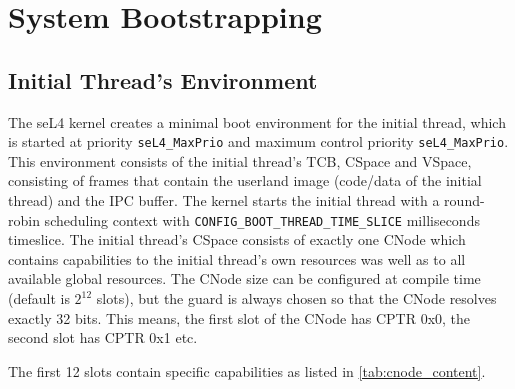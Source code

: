 %
%
%
%

\chapter{\label{ch:bootup}System Bootstrapping}

\section{Initial Thread's Environment}

The seL4 kernel creates a minimal boot environment for the initial thread, which
 is started at priority \texttt{seL4\_MaxPrio} and maximum control priority \texttt{seL4\_MaxPrio}.
This environment consists of the initial thread's TCB, CSpace and VSpace,
consisting of frames that contain the userland image (code/data of the initial
thread) and the IPC buffer.
The kernel starts the initial thread with a round-robin scheduling context with
\texttt{CONFIG\_BOOT\_THREAD\_TIME\_SLICE} milliseconds timeslice.
The initial thread's CSpace consists of exactly one CNode
which contains capabilities to the initial
thread's own resources was well as to all available global resources.
The CNode size can be configured at compile time (default is $2^{12}$
slots), but the guard is always chosen so that the CNode resolves exactly
32 bits. This means, the first slot of the CNode has CPTR 0x0, the
second slot has CPTR 0x1 etc.

The first 12 slots contain specific capabilities as listed in
\autoref{tab:cnode_content}.

